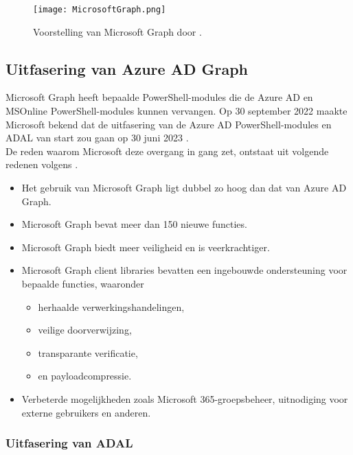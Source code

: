 \begin{figure}[h]
    \texttt{[image: MicrosoftGraph.png]}
    \caption[Voorbeeld Microsoft Graph]{Voorstelling van Microsoft Graph door \textcite{Microsoft2023d}.}
    \label{msg}
\end{figure}

\subsection{Uitfasering van Azure AD Graph}

 
Microsoft Graph heeft bepaalde PowerShell-modules die de Azure \ac{AD} en MSOnline PowerShell-modules kunnen vervangen. Op 30 september 2022 maakte Microsoft bekend dat de uitfasering van de Azure \ac{AD} PowerShell-modules en \ac{ADAL} van start zou gaan op 30 juni 2023 \autocite{Sahay2022}. \\

De reden waarom Microsoft deze overgang in gang zet, ontstaat uit volgende redenen volgens \textcite{Microsoft2023e}.

\begin{itemize}
    \item Het gebruik van Microsoft Graph ligt dubbel zo hoog dan dat van Azure \ac{AD} Graph.
    \item Microsoft Graph bevat meer dan 150 nieuwe functies.
    \item Microsoft Graph biedt meer veiligheid en is veerkrachtiger.
    \item Microsoft Graph client libraries bevatten een ingebouwde ondersteuning voor bepaalde functies, waaronder
    \begin{itemize}
        \item herhaalde verwerkingshandelingen,
        \item veilige doorverwijzing,
        \item transparante verificatie,
        \item en payloadcompressie.
    \end{itemize}
    \item Verbeterde mogelijkheden zoals Microsoft 365-groepsbeheer, uitnodiging voor externe gebruikers en anderen.
\end{itemize} 

\subsubsection{Uitfasering van ADAL}

